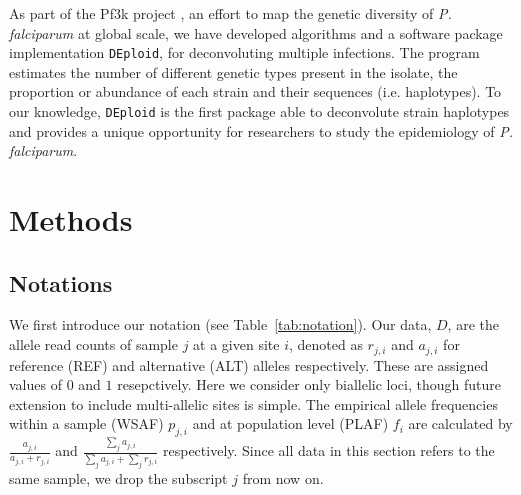 \documentclass{bioinfo}
\begin{document}
As part of the Pf3k project \citep{Pf3k2016}, an effort to map the genetic diversity of {\it P. falciparum} at global scale, we have developed algorithms and a software package implementation \texttt{DEploid}, for deconvoluting multiple infections. The program estimates the number of different genetic types present in the isolate, the proportion or abundance of each strain and their sequences (i.e. haplotypes). To our knowledge, \texttt{DEploid} is the first package able to deconvolute strain haplotypes and provides a unique opportunity for researchers to study the epidemiology of {\it P. falciparum}.


\section{Methods}

\subsection{Notations}

We first introduce our notation (see Table~\ref{tab:notation}). Our data, $D$, are the allele read counts of sample $j$ at a given site $i$, denoted as $r_{j,i}$ and $a_{j,i}$ for reference (REF) and alternative (ALT) alleles respectively.  These are assigned values of $0$ and $1$ resepctively. Here we consider only biallelic loci, though future extension to include multi-allelic sites is simple.  The empirical allele frequencies within a sample (WSAF) $p_{j,i}$ and at population level (PLAF) $f_i$ are calculated by $ \frac{a_{j,i}}{a_{j,i} + r_{j,i}}$ and $ \frac{\sum_j a_{j,i}}{\sum_j a_{j,i} + \sum_j r_{j,i}}$ respectively. Since all data in this section refers to the same sample, we drop the subscript $j$ from now on.
\end{document}
